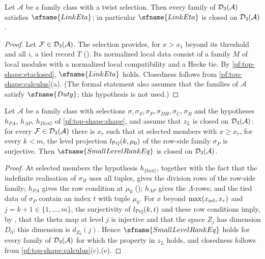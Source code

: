 \begin{proposition}\label{pf:top-shape:eta}
Let $\mathcal A$ be a family class with a twist selection. Then every family of $\mathcal{D}_3(\mathcal A)$ satisfies
$\sfname{LinkEta}$; in particular $\sfname{LinkEta}$ is closed on $\mathcal{D}_3(\mathcal A)$.
\end{proposition}

\begin{proof}
Let $\mathcal{F}\in\mathcal{D}_3(\mathcal A)$. The selection provides, for $x>x_1$ beyond its threshold and all $i$, a
tied record $T$ (). Its normalized local data consist of a
family $M$ of local modules with a normalized local compatibility and a Hecke tie. By \cref{pf:top-shape:etaclosed},
$\sfname{LinkEta}$ holds.
Closedness follows from \cref{pf:top-shape:calculus}(a). (The formal statement also assumes that the families of
$\mathcal A$ satisfy $\sfname{Duty}$; this hypothesis is not used.)
\end{proof}

\begin{proposition}\label{pf:top-shape:small}
Let $\mathcal A$ be a family class with selections $\sigma,\sigma_S,\sigma_P,\sigma_{DH},\sigma_C,\sigma_B$ and the
hypotheses $h_{PA}$, $h_{\Lambda P}$, $h_{DivG}$ of \cref{pf:top-shape:shape}, and assume that $z_L$ is closed on
$\mathcal{D}_3(\mathcal A)$: for every $\mathcal{F}\in\mathcal{D}_3(\mathcal A)$ there is $x_r$ such that at selected members
with $x\ge x_r$, for every $k<m$, the level projection $l_{\rm Prj}(k,\mu_0)$ of the row-side family $\sigma_P$ is
surjective. Then $\sfname{SmallLevelRankEq}$ is closed on $\mathcal{D}_3(\mathcal A)$.
\end{proposition}

\begin{proof}
At selected members the hypothesis $h_{DivG}$, together with the fact that the indefinite realisation of
$\sigma_B$ uses all tuples, gives the division rows of the row-side family; $h_{PA}$ gives the row condition at
$\mu_0$ (); $h_{\Lambda P}$ gives the
$\Lambda$-rows; and the tied data of $\sigma_P$ contain an index $t$ with tuple $\mu_0$. For $x$ beyond
$\max(x_{\rm sel},x_r)$ and $j=k+1\in\{1,\dots,m\}$, the surjectivity of $l_{\rm Prj}(k,t)$ and these row
conditions imply, by ,
that the theta map at level $j$ is injective and that the space $Z_j$ has dimension $D_0$; this dimension is
$d_{Z_0}(j)$. Hence $\sfname{SmallLevelRankEq}$ holds for every family of $\mathcal{D}_3(\mathcal A)$ for which the
property in $z_L$ holds, and closedness follows from \cref{pf:top-shape:calculus}(c),(e).
\end{proof}


